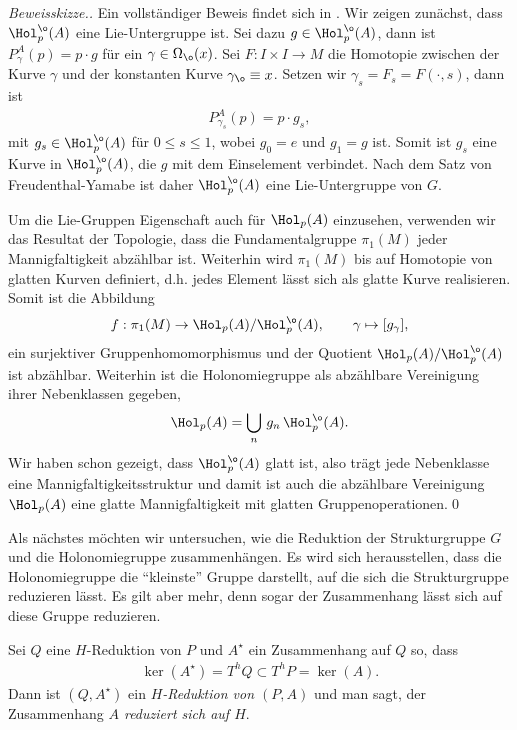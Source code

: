 \documentclass[%
	paper=a5,%
	fleqn,%
	DIV=18,%
	BCOR=0mm,
	fontsize=11pt,
	titlepage=false,%
	bibliography=totoc,
	DIV=18,%
	twoside=true,
	pdftitle=Riemannsche Geometrie,
	pdfauthor=Uwe Semmelmann,
	numbers=noendperiod]%
	{scrbook}
\begin{document}
\begin{proof}[Beweisskizze.] Ein vollständiger Beweis findet sich in \cite[Satz 4.3]{Baum:2009wk}.
Wir zeigen zunächst, dass $\Hol_{p}^{\o}(A)$ eine Lie-Untergruppe ist. Sei dazu $g\in \Hol_{p}^{\o}(A)$, dann ist $P_{\gamma}^A(p) = p\cdot g$ für ein $\gamma\in \Omega_{\o}(x)$. Sei $F: I\times I\to M$ die Homotopie zwischen der Kurve $\gamma$ und der konstanten Kurve $\gamma_{\o}\equiv x$. Setzen wir $\gamma_{s} = F_{s} = F(\cdot,s)$, dann ist
\begin{align*}
P_{\gamma_{s}}^A(p) =p\cdot g_{s},
\end{align*}
mit $g_{s}\in \Hol_{p}^\o(A)$ für $0\le s \le 1$, wobei $g_{0} = e$ und $g_{1} = g$ ist. Somit ist $g_{s}$ eine Kurve in $\Hol_{p}^\o(A)$, die $g$ mit dem Einselement verbindet. Nach dem Satz von Freudenthal-Yamabe ist daher $\Hol_{p}^\o(A)$ eine Lie-Untergruppe von $G$.

Um die Lie-Gruppen Eigenschaft auch für $\Hol_{p}(A)$ einzusehen, verwenden wir das Resultat der Topologie, dass die Fundamentalgruppe $\pi_{1}(M)$
jeder Mannigfaltigkeit abzählbar ist. Weiterhin wird $\pi_{1}(M)$ bis auf Homotopie von glatten Kurven definiert, d.h. jedes Element lässt sich als glatte Kurve realisieren. Somit ist die Abbildung
\begin{align*}
f: \pi_{1}(M)\to \Hol_{p}(A)/\Hol_{p}^\o(A),\qquad \gamma\mapsto [g_{\gamma}],
\end{align*}
ein surjektiver Gruppenhomomorphismus und der Quotient $\Hol_{p}(A)/\Hol_{p}^\o(A)$ ist abzählbar. Weiterhin ist die Holonomiegruppe als abzählbare Vereinigung ihrer Nebenklassen gegeben,
\begin{align*}
\Hol_{p}(A)  = \bigcup_{n} \,g_{n}\,\Hol_{p}^\o(A).
\end{align*}
Wir haben schon gezeigt, dass $\Hol_{p}^\o(A)$ glatt ist, also trägt jede Nebenklasse eine Mannigfaltigkeitsstruktur und damit ist auch die abzählbare Vereinigung $\Hol_{p}(A)$ eine glatte Mannigfaltigkeit mit glatten Gruppenoperationen.\qed
\end{proof}

Als nächstes möchten wir untersuchen, wie die Reduktion der Strukturgruppe $G$ und die Holonomiegruppe zusammenhängen. Es wird sich herausstellen, dass die Holonomiegruppe die ``kleinste'' Gruppe darstellt, auf die sich die Strukturgruppe reduzieren lässt. Es gilt aber mehr, denn sogar der Zusammenhang lässt sich auf diese Gruppe reduzieren.

\begin{defn}
Sei $Q$ eine $H$-Reduktion von $P$ und $A^\star$ ein Zusammenhang auf $Q$ so, dass
\begin{align*}
\ker(A^\star) = T^hQ \subset T^hP = \ker(A).
\end{align*}
Dann ist $(Q,A^\star)$ ein \emph{$H$-Reduktion von $(P,A)$} und man sagt, der Zusammenhang \emph{$A$ reduziert sich auf $H$}.\fish
\end{defn}
\end{document}
